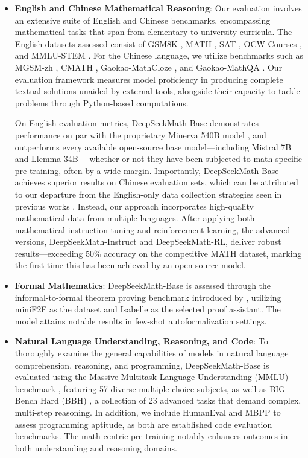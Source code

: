 \begin{itemize}[topsep=0pt]
    \item \textbf{English and Chinese Mathematical Reasoning}: Our evaluation involves an extensive suite of English and Chinese benchmarks, encompassing mathematical tasks that span from elementary to university curricula. The English datasets assessed consist of GSM8K \citep{gsm8k}, MATH \citep{MATH}, SAT \citep{llemma}, OCW Courses \citep{minerva}, and MMLU-STEM \citep{mmlu}. For the Chinese language, we utilize benchmarks such as MGSM-zh \citep{mgsm}, CMATH \citep{wei2023cmath}, Gaokao-MathCloze \citep{agieval}, and Gaokao-MathQA \citep{agieval}. Our evaluation framework measures model proficiency in producing complete textual solutions unaided by external tools, alongside their capacity to tackle problems through Python-based computations.

On English evaluation metrics, DeepSeekMath-Base demonstrates performance on par with the proprietary Minerva 540B model \citep{minerva}, and outperforms every available open-source base model—including Mistral 7B \citep{mistral} and Llemma-34B \citep{llemma}—whether or not they have been subjected to math-specific pre-training, often by a wide margin. Importantly, DeepSeekMath-Base achieves superior results on Chinese evaluation sets, which can be attributed to our departure from the English-only data collection strategies seen in previous works \citep{minerva, llemma}. Instead, our approach incorporates high-quality mathematical data from multiple languages. After applying both mathematical instruction tuning and reinforcement learning, the advanced versions, DeepSeekMath-Instruct and DeepSeekMath-RL, deliver robust results—exceeding 50\% accuracy on the competitive MATH dataset, marking the first time this has been achieved by an open-source model.

\item \textbf{Formal Mathematics}: DeepSeekMath-Base is assessed through the informal-to-formal theorem proving benchmark introduced by \citep{dsp_proof}, utilizing miniF2F \citep{minif2f} as the dataset and Isabelle \citep{isabelle} as the selected proof assistant. The model attains notable results in few-shot autoformalization settings.
\item \textbf{Natural Language Understanding, Reasoning, and Code}: To thoroughly examine the general capabilities of models in natural language comprehension, reasoning, and programming, DeepSeekMath-Base is evaluated using the Massive Multitask Language Understanding (MMLU) benchmark \citep{mmlu}, featuring 57 diverse multiple-choice subjects, as well as BIG-Bench Hard (BBH) \citep{bbh}, a collection of 23 advanced tasks that demand complex, multi-step reasoning. In addition, we include HumanEval \citep{codex} and MBPP \citep{mbpp} to assess programming aptitude, as both are established code evaluation benchmarks. The math-centric pre-training notably enhances outcomes in both understanding and reasoning domains.


\end{itemize}
